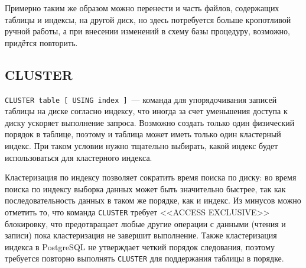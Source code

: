 Примерно таким же образом можно перенести и часть файлов, содержащих таблицы и индексы, на другой диск, но здесь потребуется больше кропотливой ручной работы, а при внесении изменений в схему базы процедуру, возможно, придётся повторить.


\subsection{CLUSTER}
\label{sec:hard-drive-cluster}

\lstinline!CLUSTER table [ USING index ]!~--- команда для упорядочивания записей таблицы на диске согласно индексу, что иногда за счет уменьшения доступа к диску ускоряет выполнение запроса. Возможно создать только один физический порядок в таблице, поэтому и таблица может иметь только один кластерный индекс. При таком условии нужно тщательно выбирать, какой индекс будет использоваться для кластерного индекса.

Кластеризация по индексу позволяет сократить время поиска по диску: во время поиска по индексу выборка данных может быть значительно быстрее, так как последовательность данных в таком же порядке, как и индекс. Из минусов можно отметить то, что команда \lstinline!CLUSTER! требует <<ACCESS EXCLUSIVE>> блокировку, что предотвращает любые другие операции с данными (чтения и записи) пока кластеризация не завершит выполнение. Также кластеризация индекса в PostgreSQL не утверждает четкий порядок следования, поэтому требуется повторно выполнять \lstinline!CLUSTER! для поддержания таблицы в порядке.